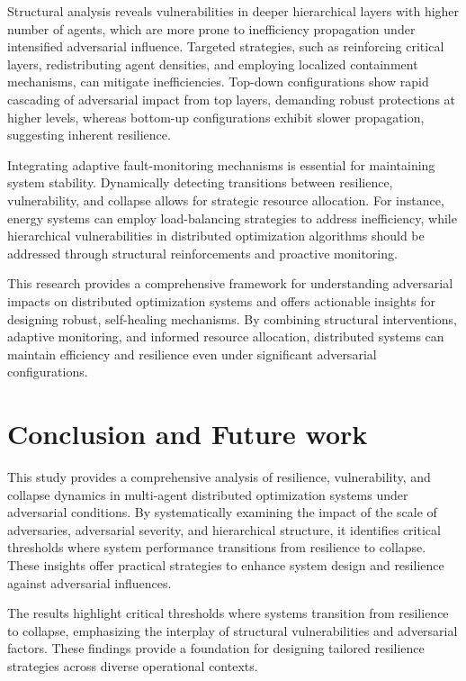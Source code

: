 \documentclass[journal]{IEEEtran}
\begin{document}
Structural analysis reveals vulnerabilities in deeper hierarchical layers with higher number of agents, which are more prone to inefficiency propagation under intensified adversarial influence. Targeted strategies, such as reinforcing critical layers, redistributing agent densities, and employing localized containment mechanisms, can mitigate inefficiencies. Top-down configurations show rapid cascading of adversarial impact from top layers, demanding robust protections at higher levels, whereas bottom-up configurations exhibit slower propagation, suggesting inherent resilience.

Integrating adaptive fault-monitoring mechanisms is essential for maintaining system stability. Dynamically detecting transitions between resilience, vulnerability, and collapse allows for strategic resource allocation. For instance, energy systems can employ load-balancing strategies to address inefficiency, while hierarchical vulnerabilities in distributed optimization algorithms should be addressed through structural reinforcements and proactive monitoring.

This research provides a comprehensive framework for understanding adversarial impacts on distributed optimization systems and offers actionable insights for designing robust, self-healing mechanisms. By combining structural interventions, adaptive monitoring, and informed resource allocation, distributed systems can maintain efficiency and resilience even under significant adversarial configurations.

\section{Conclusion and Future work} \label{sec6}
This study provides a comprehensive analysis of resilience, vulnerability, and collapse dynamics in multi-agent distributed optimization systems under adversarial conditions. By systematically examining the impact of the scale of adversaries, adversarial severity, and hierarchical structure, it identifies critical thresholds where system performance transitions from resilience to collapse. These insights offer practical strategies to enhance system design and resilience against adversarial influences.

The results highlight critical thresholds where systems transition from resilience to collapse, emphasizing the interplay of structural vulnerabilities and adversarial factors. These findings provide a foundation for designing tailored resilience strategies across diverse operational contexts.
\end{document}
